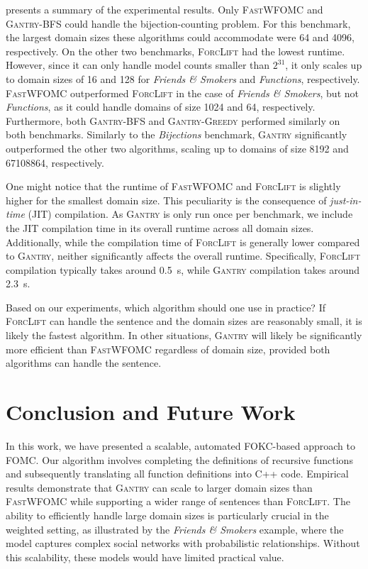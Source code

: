 \documentclass[a4paper,UKenglish,cleveref,autoref,thm-restate]{lipics-v2021}
\newcommand{\Cranetwo}{\textsc{Gantry}}
\newcommand{\Cranebfs}{\textsc{Gantry-BFS}}
\newcommand{\Cranegreedy}{\textsc{Gantry-Greedy}}
\newcommand{\friends}{\emph{Friends \& Smokers}}
\newcommand{\functions}{\emph{Functions}}
\newcommand{\bijections}{\emph{Bijections}}
\begin{document}
 presents a summary of the experimental results. Only
\textsc{FastWFOMC} and \Cranebfs{} could handle the bijection-counting problem.
For this benchmark, the largest domain sizes these algorithms could accommodate
were \num{64} and \num{4096}, respectively. On the other two benchmarks,
\textsc{ForcLift} had the lowest runtime. However, since it can only handle
model counts smaller than $2^{31}$, it only scales up to domain sizes of
\num{16} and \num{128} for \friends{} and \functions{}, respectively.
\textsc{FastWFOMC} outperformed \textsc{ForcLift} in the case of \friends{}, but
not \functions{}, as it could handle domains of size \num{1024} and \num{64},
respectively. Furthermore, both \Cranebfs{} and \Cranegreedy{} performed
similarly on both benchmarks. Similarly to the \bijections{} benchmark,
\Cranetwo{} significantly outperformed the other two algorithms, scaling up to
domains of size \num{8192} and \num{67108864}, respectively.

One might notice that the runtime of \textsc{FastWFOMC} and \textsc{ForcLift} is
slightly higher for the smallest domain size. This peculiarity is the
consequence of \emph{just-in-time} (JIT) compilation. As \Cranetwo{} is only run
once per benchmark, we include the JIT compilation time in its overall runtime
across all domain sizes. Additionally, while the compilation time of
\textsc{ForcLift} is generally lower compared to \Cranetwo{}, neither
significantly affects the overall runtime. Specifically, \textsc{ForcLift}
compilation typically takes around \SI{0.5}{\second}, while \Cranetwo{}
compilation takes around \SI{2.3}{\second}.

Based on our experiments, which algorithm should one use in practice? If
\textsc{ForcLift} can handle the sentence and the domain sizes are reasonably
small, it is likely the fastest algorithm. In other situations, \Cranetwo{} will
likely be significantly more efficient than \textsc{FastWFOMC} regardless of
domain size, provided both algorithms can handle the sentence.

\section{Conclusion and Future Work}\label{sec:conclusion}

In this work, we have presented a scalable, automated FOKC-based approach to
FOMC\@. Our algorithm involves completing the definitions of recursive functions
and subsequently translating all function definitions into C++ code. Empirical
results demonstrate that \Cranetwo{} can scale to larger domain sizes than
\textsc{FastWFOMC} while supporting a wider range of sentences than
\textsc{ForcLift}. The ability to efficiently handle large domain sizes is
particularly crucial in the weighted setting, as illustrated by the \friends{}
example, where the model captures complex social networks with probabilistic
relationships. Without this scalability, these models would have limited
practical value.
\end{document}
